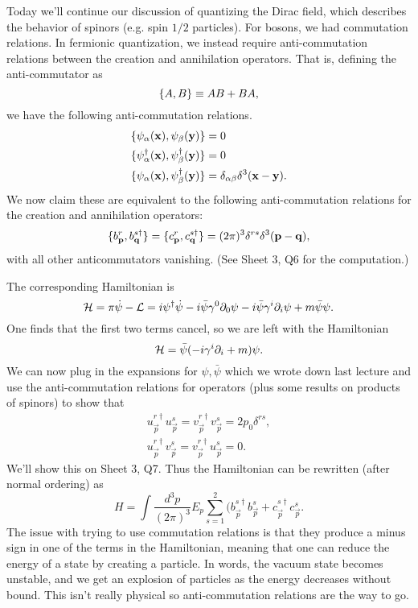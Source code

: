 Today we'll continue our discussion of quantizing the Dirac field, which describes the behavior of spinors (e.g. spin $1/2$ particles). For bosons, we had commutation relations. In fermionic quantization, we instead require anti-commutation relations between the creation and annihilation operators. That is, defining the anti-commutator as
$$\{A,B\}\equiv AB+BA,$$
we have the following anti-commutation relations.
\begin{align*}
    \{\psi_\alpha(\boldsymbol{\mathbf{x}}),\psi_\beta (\boldsymbol{\mathbf{y}})\}&=0\\
    \{\psi_\alpha^\dagger(\boldsymbol{\mathbf{x}}),\psi_\beta^\dagger(\boldsymbol{\mathbf{y}})\}&=0\\
    \{\psi_\alpha(\boldsymbol{\mathbf{x}}),\psi_\beta^\dagger(\boldsymbol{\mathbf{y}})\}&=\delta_{\alpha\beta}\delta^3(\boldsymbol{\mathbf{x}} -\boldsymbol{\mathbf{y}}).
\end{align*}
We now claim these are equivalent to the following anti-commutation relations for the creation and annihilation operators:
$$\{b_{\boldsymbol{\mathbf{p}}}^r,b_{\boldsymbol{\mathbf{q}}}^{s\dagger}\}=\{c_{\boldsymbol{\mathbf{p}}}^r, c_{\boldsymbol{\mathbf{q}}}^{s\dagger}\}=(2\pi)^3 \delta^{rs}\delta^3(\boldsymbol{\mathbf{p}} -\boldsymbol{\mathbf{q}}),$$
with all other anticommutators vanishing. (See Sheet 3, Q6 for the computation.)

The corresponding Hamiltonian is
$$\mathcal H=\pi \dot \psi -\mathcal L=i\psi^\dagger \dot \psi-i\bar \psi \gamma^0 \partial_0 \psi -i\bar \psi \gamma^i \partial_i \psi+m\bar \psi \psi.$$
One finds that the first two terms cancel, so we are left with the Hamiltonian
$$\mathcal H=\bar \psi(-i \gamma^i \partial_i +m) \psi.$$
We can now plug in the expansions for $\psi,\bar\psi$ which we wrote down last lecture and use the anti-commutation relations for operators (plus some results on products of spinors) to show that
\begin{gather*}
    u_{\vec p}^{r\dagger} u_{\vec p}^s = v_{\vec p}^{r\dagger} v_{\vec p}^s = 2p_0 \delta^{rs},\\
    u_{\vec p}^{r\dagger} v_{\vec p}^s = v_{\vec p}^{r\dagger}u_{\vec p}^s=0.
\end{gather*}
We'll show this on Sheet 3, Q7. Thus the Hamiltonian can be rewritten (after normal ordering) as
$$H=\int \frac{d^3p}{(2\pi)^3}E_p \sum_{s=1}^2 (b_{\vec p}^{s\dagger} b_{\vec p}^s + c_{\vec p}^{s\dagger}c_{\vec p}^s.$$
The issue with trying to use commutation relations is that they produce a minus sign in one of the terms in the Hamiltonian, meaning that one can reduce the energy of a state by creating a particle. In words, the vacuum state becomes unstable, and we get an explosion of particles as the energy decreases without bound. This isn't really physical so anti-commutation relations are the way to go.


